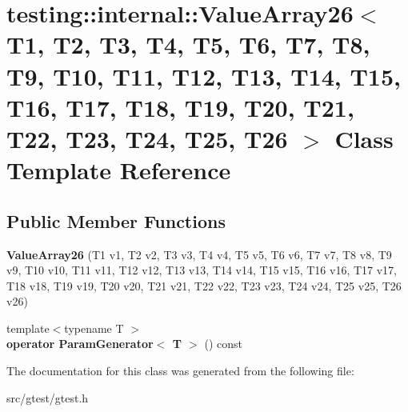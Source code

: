 \hypertarget{classtesting_1_1internal_1_1_value_array26}{}\section{testing\+:\+:internal\+:\+:Value\+Array26$<$ T1, T2, T3, T4, T5, T6, T7, T8, T9, T10, T11, T12, T13, T14, T15, T16, T17, T18, T19, T20, T21, T22, T23, T24, T25, T26 $>$ Class Template Reference}
\label{classtesting_1_1internal_1_1_value_array26}
\subsection*{Public Member Functions}
\begin{DoxyCompactItemize}
\item 
\mbox{\label{classtesting_1_1internal_1_1_value_array26_aec16334223f12b85aa7b6c260ac5567b}} 
{\bfseries Value\+Array26} (T1 v1, T2 v2, T3 v3, T4 v4, T5 v5, T6 v6, T7 v7, T8 v8, T9 v9, T10 v10, T11 v11, T12 v12, T13 v13, T14 v14, T15 v15, T16 v16, T17 v17, T18 v18, T19 v19, T20 v20, T21 v21, T22 v22, T23 v23, T24 v24, T25 v25, T26 v26)
\item 
\mbox{\label{classtesting_1_1internal_1_1_value_array26_adc70c82cb08c26c952e2d41b23844a72}} 
{\footnotesize template$<$typename T $>$ }\\{\bfseries operator Param\+Generator$<$ T $>$} () const
\end{DoxyCompactItemize}


The documentation for this class was generated from the following file\+:\begin{DoxyCompactItemize}
\item 
src/gtest/gtest.\+h\end{DoxyCompactItemize}
